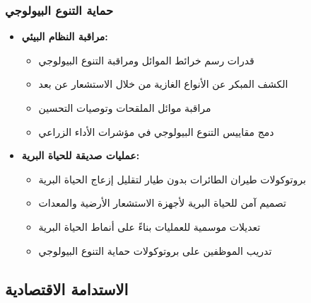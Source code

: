 \subsubsection{حماية التنوع البيولوجي}
\begin{itemize}
    \item \textbf{مراقبة النظام البيئي:}
    \begin{itemize}
        \item قدرات رسم خرائط الموائل ومراقبة التنوع البيولوجي
        \item الكشف المبكر عن الأنواع الغازية من خلال الاستشعار عن بعد
        \item مراقبة موائل الملقحات وتوصيات التحسين
        \item دمج مقاييس التنوع البيولوجي في مؤشرات الأداء الزراعي
    \end{itemize}
    
    \item \textbf{عمليات صديقة للحياة البرية:}
    \begin{itemize}
        \item بروتوكولات طيران الطائرات بدون طيار لتقليل إزعاج الحياة البرية
        \item تصميم آمن للحياة البرية لأجهزة الاستشعار الأرضية والمعدات
        \item تعديلات موسمية للعمليات بناءً على أنماط الحياة البرية
        \item تدريب الموظفين على بروتوكولات حماية التنوع البيولوجي
    \end{itemize}
\end{itemize}

\subsection{الاستدامة الاقتصادية}

